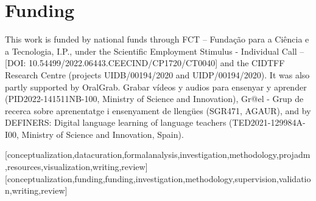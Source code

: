\documentclass[english]{textolivre}
\begin{document}
\begin{polyabstract}
\begin{portuguese}
\begin{abstract}
\end{abstract}
\end{portuguese}
\end{polyabstract}

%
%
%
%


\section*{Funding}\label{sec-funding}
This work is funded by national funds through FCT – Fundação para a Ciência e a Tecnologia, I.P., under the Scientific Employment Stimulus - Individual Call – [DOI: 10.54499/\allowbreak{}2022.\allowbreak{}06443.\allowbreak{}CEECIND/\allowbreak{}CP1720/\allowbreak{}CT0040] and the CIDTFF Research Centre (projects UIDB/00194/2020 and UIDP/00194/2020). It was also partly supported by OralGrab. Grabar vídeos y audios para ensenyar y aprender (PID2022-141511NB-100, Ministry of Science and Innovation), Gr@el - Grup de recerca sobre aprenentatge i ensenyament de llengües (SGR471, AGAUR), and by DEFINERS: Digital language learning of language teachers (TED2021-129984A-I00, Ministry of Science and Innovation, Spain).


\printbibliography
\label{sec-bib}
\begin{contributors}
[conceptualization,datacuration,formalanalysis,investigation,methodology,projadm,resources,visualization,writing,review]
[conceptualization,funding,funding,investigation,methodology,supervision,validation,writing,review]
\end{contributors}


\newpage

\end{document}
